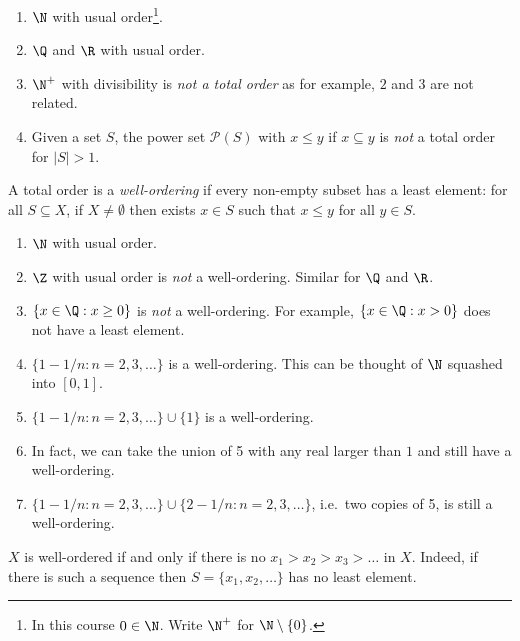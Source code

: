 \documentclass[a4paper]{article}
\begin{document}
\begin{eg}\leavevmode
  \begin{enumerate}
  \item \(\N\) with usual order\footnote{In this course \(0 \in \N\). Write \(\N^+\) for \(\N \setminus \{0\}\).}.
  \item \(\Q\) and \(\R\) with usual order.
  \item \(\N^+\) with divisibility is \emph{not a total order} as for example, \(2\) and \(3\) are not related.
  \item Given a set \(S\), the power set \(\mathcal P(S)\) with \(x \leq y\) if \(x \subseteq y\) is \emph{not} a total order for \(|S| > 1\).
  \end{enumerate}
\end{eg}

\begin{definition}
  A total order is a \emph{well-ordering} if every non-empty subset has a least element: for all \(S \subseteq X\), if \(X \neq \emptyset\) then exists \(x \in S\) such that \(x \leq y\) for all \(y \in S\).
\end{definition}

\begin{eg}\leavevmode
  \begin{enumerate}
  \item \(\N\) with usual order.
  \item \(\Z\) with usual order is \emph{not} a well-ordering. Similar for \(\Q\) and \(\R\).
  \item \(\{x \in \Q: x \geq 0\}\) is \emph{not} a well-ordering. For example, \(\{x \in \Q: x > 0\}\) does not have a least element.
  \item \(\{1 - 1/n: n = 2, 3, \dots\}\) is a well-ordering. This can be thought of \(\N\) squashed into \([0, 1]\).
  \item \(\{1 - 1/n: n = 2, 3, \dots\} \cup \{1\}\) is a well-ordering.
  \item In fact, we can take the union of 5 with any real larger than \(1\) and still have a well-ordering.
  \item \(\{1 - 1/n: n = 2, 3, \dots\} \cup \{2 - 1/n: n = 2, 3, \dots\}\), i.e.\ two copies of 5, is still a well-ordering.
  \end{enumerate}
\end{eg}

\begin{remark}
  \(X\) is well-ordered if and only if there is no \(x_1 > x_2 > x_3 > \dots\) in \(X\). Indeed, if there is such a sequence then \(S = \{x_1, x_2, \dots\}\) has no least element.
\end{remark}
\end{document}
